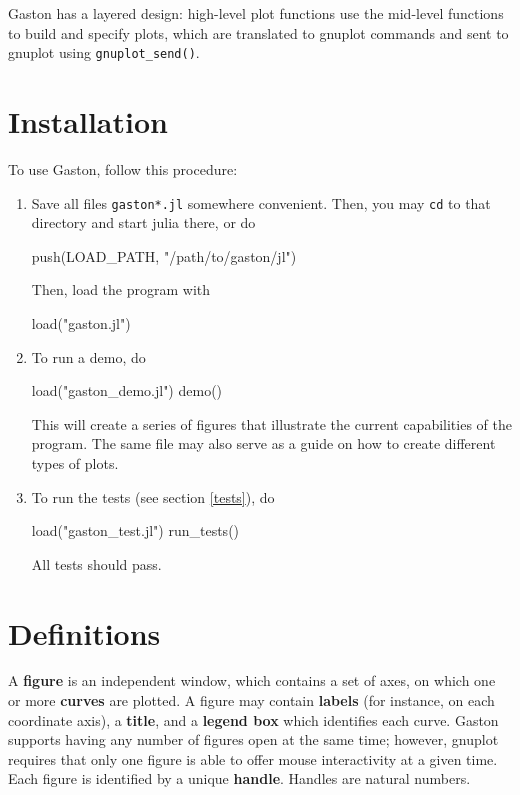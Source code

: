 \documentclass[11pt]{article}
\newcommand{\cmd}[1]{\texttt{#1}}
\begin{document}
Gaston has a layered design: high-level plot functions use the mid-level
functions to build and specify plots, which are translated to gnuplot commands
and sent to gnuplot using \cmd{gnuplot\_send()}.

\section{Installation}

To use Gaston, follow this procedure:

\begin{enumerate}

\item Save all files \cmd{gaston*.jl} somewhere convenient. Then,
	you may \cmd{cd} to that directory and start julia there, or do

\begin{juliacode}
push(LOAD_PATH, "/path/to/gaston/jl")
\end{juliacode}

Then, load the program with

\begin{juliacode}
load("gaston.jl")
\end{juliacode}

\item To run a demo, do

\begin{juliacode}
load("gaston_demo.jl")
demo()
\end{juliacode}

This will create a series of figures that illustrate the current capabilities
of the program. The same file may also serve as a guide on how to create
different types of plots.

\item To run the tests (see section \ref{tests}), do

\begin{juliacode}
load("gaston_test.jl")
run_tests()
\end{juliacode}

All tests should pass.

\end{enumerate}

\section{Definitions}

A \textbf{figure} is an independent window, which contains a set of axes, on
which one or more \textbf{curves} are plotted. A figure may contain
\textbf{labels} (for instance, on each coordinate axis), a \textbf{title}, and a
\textbf{legend box} which identifies each curve. Gaston supports having any
number of figures open at the same time; however, gnuplot requires that only
one figure is able to offer mouse interactivity at a given time. Each figure is
identified by a unique \textbf{handle}. Handles are natural numbers.
\end{document}
